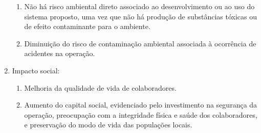 \begin{enumerate}
\begin{enumerate}
			\item Não há risco ambiental direto associado ao desenvolvimento ou ao uso do sistema proposto, uma vez que não há produção de substâncias tóxicas ou de efeito contaminante para o ambiente.
			\item Diminuição do risco de contaminação ambiental associada à ocorrência de acidentes na operação.  
		\end{enumerate}
	\item Impacto social:
		\begin{enumerate}
			\item Melhoria da qualidade de vida de colaboradores.
			\item Aumento do capital social, evidenciado pelo investimento na segurança da operação, preocupação com a integridade física e saúde dos colaboradores, e preservação do modo de vida das populações locais.
		\end{enumerate}
\end{enumerate}
